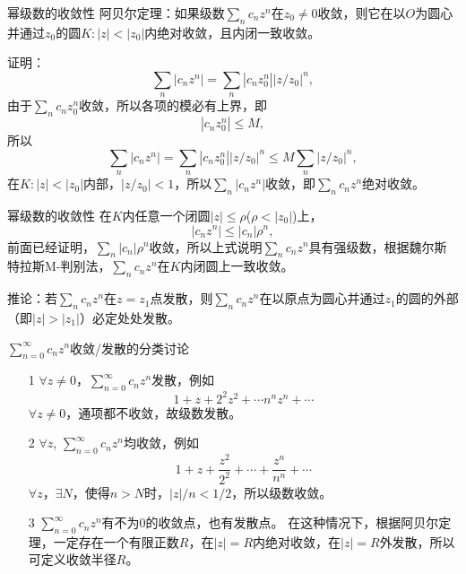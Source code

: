 \documentclass[11pt]{beamer}
\newcommand{\kong}[1][0.5]{\vspace{#1cm}}
\begin{document}
\begin{frame}{幂级数的收敛性}
阿贝尔定理：如果级数$\sum_n c_n z^n$在$z_0 \neq 0$收敛，则它在以$O$为圆心并通过$z_0$的圆$K: |z|<|z_0|$内绝对收敛，且内闭一致收敛。

\kong[0.5]
证明：
\begin{equation}
\sum_n |c_n z^n| = \sum_n |c_n z^n_0| | z/z_0|^n,
\end{equation}
由于$\sum_n c_n z^n_0$收敛，所以各项的模必有上界，即
\begin{equation}
|c_n z^n_0 | \leq M,
\end{equation}
所以
\begin{equation}
\sum_n |c_n z^n| = \sum_n |c_n z^n_0| | z/z_0|^n
\leq M \sum_n |z/z_0|^n,
\end{equation}
在$K: |z|<|z_0|$内部，$|z/z_0|<1$，所以$\sum_n |c_n z^n|$收敛，即$\sum_n c_n z^n$绝对收敛。
\end{frame}

\begin{frame}{幂级数的收敛性}
在$K$内任意一个闭圆$|z|\leq \rho$($\rho < |z_0|$)上，
\begin{equation}
|c_n z^n| \leq |c_n| \rho^n,
\end{equation}
前面已经证明，$\sum_n |c_n| \rho^n$收敛，所以上式说明$\sum_n c_n z^n$具有强级数，根据魏尔斯特拉斯M-判别法，$\sum_n c_n z^n$在$K$内闭圆上一致收敛。

\kong[0.5]
推论：若$\sum_n c_n z^n$在$z=z_1$点发散，则$\sum_n c_n z^n$在以原点为圆心并通过$z_1$的圆的外部（即$|z|>|z_1|$）必定处处发散。
\end{frame}

\begin{frame}{$\sum^\infty_{n=0} c_n z^n$收敛/发散的分类讨论}
\begin{itemize}
	\item [1] $\forall z \neq 0$，$\sum_{n=0}^{\infty}c_n z^n$发散，例如
	\begin{equation}
	1 + z + 2^2 z^2 + \cdots n^n z^n + \cdots
	\end{equation}
	$\forall z \neq 0$，通项都不收敛，故级数发散。
	\item [2] $\forall z$, $\sum_{n=0}^{\infty} c_n z^n$均收敛，例如
	\begin{equation}
	1 + z + \frac{z^2}{2^2} + \cdots + \frac{z^n}{n^n} + \cdots
	\end{equation}
	$\forall z$，$\exists N$，使得$n>N$时，$|z|/n < 1/2$，所以级数收敛。
	\item [3] $\sum_{n=0}^{\infty} c_n z^n$有不为0的收敛点，也有发散点。
	在这种情况下，根据阿贝尔定理，一定存在一个有限正数$R$，在$|z|=R$内绝对收敛，在$|z|=R$外发散，所以可定义{\color{blue}收敛半径}$R$。
\end{itemize}
\end{frame}
\end{document}
